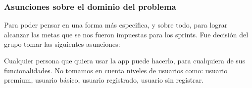\subsubsection{Asunciones sobre el dominio del problema}

Para poder pensar en una forma más especifica, y sobre todo, para lograr alcanzar las metas que se nos fueron impuestas para los sprints. Fue decisión del grupo tomar las siguientes asunciones:

\begin{itemnize}
\item Cualquier persona que quiera usar la app puede hacerlo, para cualquiera de sus funcionalidades. No tomamos en cuenta niveles de usuarios como: usuario premium, usuario básico, usuario registrado, usuario sin registrar.
\end{itemnize}
